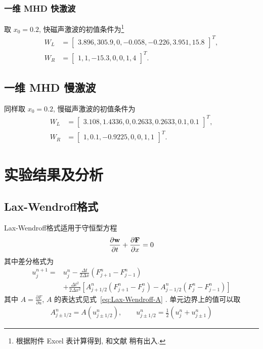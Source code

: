 \documentclass[10.5pt
]{article}
\begin{document}
\subsubsection{一维 MHD 快激波}
取 $x_0 = 0.2$, 快磁声激波的初值条件为\footnote{
  根据附件 Excel 表计算得到, 和文献 \citet{Dai1994} 稍有出入.
}
\begin{align}
W_L &= \left[\begin{array}{cccccc}
3.896,
305.9,
0,
-0.058,
-0.226,
3.951,
15.8
\end{array}\right]^T,
\nonumber\\
W_R &= \left[\begin{array}{ccccccc}
1,
1,
-15.3,
0,
0,
1,
4
\end{array}\right]^T.\label{Eqn:Fast}
\end{align}

\subsection{一维 MHD 慢激波}
同样取 $x_0 = 0.2$, 慢磁声激波的初值条件为
\begin{align}
W_L &= \left[\begin{array}{ccccccc}
3.108,
1.4336,
0,
0.2633,
0.2633,
0.1,
0.1
\end{array}\right]^T,
\nonumber\\
W_R &= \left[\begin{array}{ccccccc}
1,
0.1,
-0.9225,
0,
0,
1,
1
\end{array}\right]^T.\label{Eqn:Slow}
\end{align}

\section{实验结果及分析}

\subsection{Lax-Wendroff格式}
Lax-Wendroff格式适用于守恒型方程
\begin{align}
\frac{\partial \vb w}{\partial t} + \frac{\partial \vb F}{\partial x} = 0
\end{align}
其中差分格式为
\begin{align}
u_j^{n+1} =& u_j^n - \frac{\Delta t}{2\Delta x} (F_{j+1}^n - F_{j-1}^n) \nonumber\\
& + \frac{\Delta t^2}{2\Delta x^2} \left[A_{j+1/2}^n (F_{j+1}^n-F_j^n) - A_{j-1/2}^n (F_j^n -
F_{j-1}^n)\right]
\end{align}
其中 $A = \frac{\partial F}{\partial u}$, $A$ 的表达式见式~\eqref{eq:Lax-Wendroff-A} . 单元边界上的值可以取
\begin{align}
A_{j \pm 1/2}^n = A(u_{j \pm 1/2}^n), \qquad u_{j \pm 1/2}^n = \frac{1}{2} (u_j^n + u_{j \pm 1}^n)
\end{align}
\end{document}
